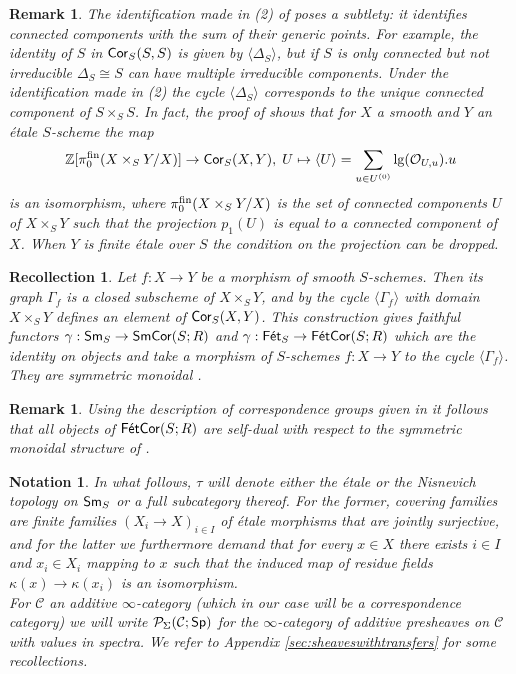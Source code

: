 \documentclass[reqno]{amsart}
\numberwithin{equation}{section}\theoremstyle{thms}
\theoremstyle{defn}
\newtheorem{nota}[equation]{Notation}
\newtheorem{rem}[equation]{Remark}
\newtheorem{rec}[equation]{Recollection}
\newcommand{\bZ}{\mathbb{Z}}
\newcommand{\cC}{\mathcal{C}}
\newcommand{\cO}{\mathcal{O}}
\newcommand{\cP}{\mathcal{P}}
\newcommand{\tn}[1]{\textnormal{#1}}
\newcommand{\tsf}[1]{\textsf{\textup{#1}}}
\newcommand{\psigma}{\cP_{\Sigma}}
\newcommand{\spec}{\tsf{Sp}}
\newcommand{\sms}{\tsf{Sm}_S}
\newcommand{\fets}{\tsf{Fét}_S}
\newcommand{\corsms}[1]{\tsf{SmCor}(S;#1)}
\newcommand{\corfets}[1]{\tsf{FétCor}(S;#1)}
\begin{document}
\begin{rem}\label{rem:isoetalecorrespondences}
The identification made in (2) of  poses a subtlety: it identifies connected components with the sum of their generic points. For example, the identity of $S$ in $\tsf{Cor}_S(S,S)$ is given by $\langle \Delta_S \rangle$, but if $S$ is only connected but not irreducible $\Delta_S \cong S$ can have multiple irreducible components. Under the identification made in (2) the cycle $\langle \Delta_S \rangle$ corresponds to the unique connected component of $S \times_S S$. In fact, the proof of \cite[Lemma 10.2.6]{cd19} shows that for $X$ a smooth and $Y$ an étale $S$-scheme the map 
$$\bZ[\pi_0^{\tn{fin}}(X \times_S Y/X)] \to \tsf{Cor}_S(X,Y), \; U \mapsto \langle U \rangle = \sum_{u \in U^{(0)}} \tn{lg}(\cO_{U,u}).u$$
is an isomorphism, where $\pi_0^{\tn{fin}}(X \times_S Y/X)$ is the set of connected components $U$ of $X \times_S Y$ such that the projection $p_1(U)$ is equal to a connected component of $X$. When $Y$ is finite étale over $S$ the condition on the projection can be dropped.
\end{rem}

\begin{rec}\label{rec:graphfunctors}
Let $f: X \to Y$ be a morphism of smooth $S$-schemes. Then its graph $\Gamma_f$ is a closed subscheme of $X \times_S Y$, and by \cite[Example 9.1.4]{cd19} the cycle $\langle \Gamma_f \rangle$ with domain $X \times_S Y$ defines an element of $\tsf{Cor}_S(X,Y)$. This construction gives faithful functors $\gamma: \sms \to \corsms{R}$ and $\gamma: \fets \to \corfets{R}$ which are the identity on objects and take a morphism of $S$-schemes $f: X \to Y$ to the cycle $\langle \Gamma_f \rangle$. They are symmetric monoidal \cite[{}9.2.4]{cd19}.
\end{rec}

\begin{rem}
Using the description of correspondence groups given in  it follows that all objects of $\corfets{R}$ are self-dual with respect to the symmetric monoidal structure of .
\end{rem}

\begin{nota}
In what follows, $\tau$ will denote either the étale or the Nisnevich topology on $\sms$ or a full subcategory thereof. For the former, covering families are finite families $(X_i \to X)_{i \in I}$ of étale morphisms that are jointly surjective, and for the latter we furthermore demand that for every $x \in X$ there exists $i \in I$ and $x_i \in X_i$ mapping to $x$ such that the induced map of residue fields $\kappa(x) \to \kappa(x_i)$ is an isomorphism. \\
For $\cC$ an additive $\infty$-category (which in our case will be a correspondence category) we will write $\psigma(\cC;\spec)$ for the $\infty$-category of additive presheaves on $\cC$ with values in spectra. We refer to Appendix \ref{sec:sheaveswithtransfers} for some recollections.
\end{nota}
\end{document}
